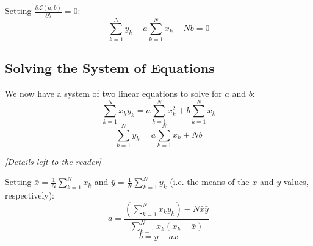 \documentclass[]{article}
\begin{document}
	Setting $\frac{\partial \mathcal{L}(a, b)}{\partial b} = 0$:
	$$
	\sum_{k=1}^{N} y_k - a \sum_{k=1}^{N} x_k - N b = 0
	$$
	
	\subsection*{Solving the System of Equations}
	We now have a system of two linear equations to solve for $a$ and $b$:
	$$
	\sum_{k=1}^{N} x_k y_k = a \sum_{k=1}^{N} x_k^2 + b \sum_{k=1}^{N} x_k
	$$
	$$
	\sum_{k=1}^{N} y_k = a \sum_{k=1}^{N} x_k + N b
	$$
	
	\vspace{1cm}
	\textit{[Details left to the reader]}
	\vspace{1cm}
	
	Setting $\bar{x} = \frac{1}{N} \sum_{k=1}^{N} x_k$ and $\bar{y} = \frac{1}{N} \sum_{k=1}^{N} y_k$ (i.e. the means of the $x$ and $y$ values, respectively):	
	$$
	a = \frac{\left( \sum_{k=1}^{N} x_ky_k \right) - N\bar{x}\bar{y}}{\sum_{k=1}^{N} x_k(x_k - \bar{x})}
	$$
	$$
	b = \bar{y} - a \bar{x}
	$$
	
\end{document}
